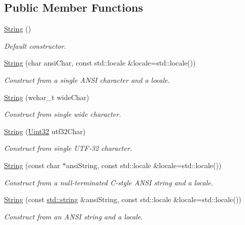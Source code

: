 \subsection*{Public Member Functions}
\begin{DoxyCompactItemize}
\item 
\hyperlink{classsf_1_1_string_a9563a4e93f692e0c8e8702b374ef8692}{String} ()
\begin{DoxyCompactList}\small\item\em Default constructor. \end{DoxyCompactList}\item 
\hyperlink{classsf_1_1_string_ac9df7f7696cff164794e338f3c89ccc5}{String} (char ansi\-Char, const std\-::locale \&locale=std\-::locale())
\begin{DoxyCompactList}\small\item\em Construct from a single A\-N\-S\-I character and a locale. \end{DoxyCompactList}\item 
\hyperlink{classsf_1_1_string_aefaa202d2aa5ff85b4f75a5983367e86}{String} (wchar\-\_\-t wide\-Char)
\begin{DoxyCompactList}\small\item\em Construct from single wide character. \end{DoxyCompactList}\item 
\hyperlink{classsf_1_1_string_a8e1a5027416d121187908e2ed77079ff}{String} (\hyperlink{namespacesf_aa746fb1ddef4410bddf198ebb27e727c}{Uint32} utf32\-Char)
\begin{DoxyCompactList}\small\item\em Construct from single U\-T\-F-\/32 character. \end{DoxyCompactList}\item 
\hyperlink{classsf_1_1_string_a57d2b8c289f9894f859564cad034bfc7}{String} (const char $\ast$ansi\-String, const std\-::locale \&locale=std\-::locale())
\begin{DoxyCompactList}\small\item\em Construct from a null-\/terminated C-\/style A\-N\-S\-I string and a locale. \end{DoxyCompactList}\item 
\hyperlink{classsf_1_1_string_a0aa41dcbd17b0c36c74d03d3b0147f1e}{String} (const \hyperlink{gl3_8h_ac83513893df92266f79a515488701770}{std\-::string} \&ansi\-String, const std\-::locale \&locale=std\-::locale())
\begin{DoxyCompactList}\small\item\em Construct from an A\-N\-S\-I string and a locale. \end{DoxyCompactList}\item 

\end{DoxyCompactItemize}
